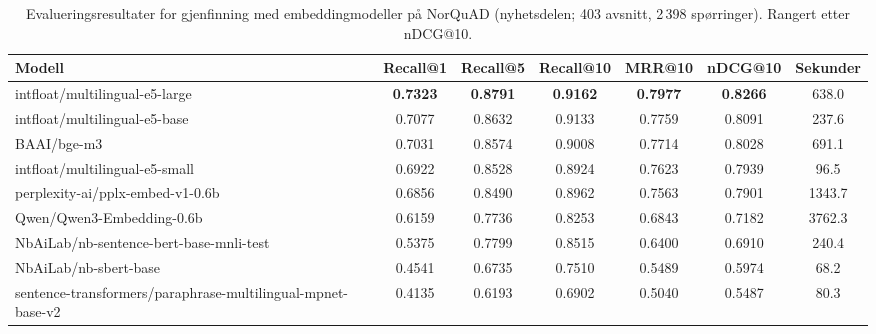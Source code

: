 \begin{table}[t]
  \centering
  \caption{Evalueringsresultater for gjenfinning med embeddingmodeller på NorQuAD (nyhetsdelen; 403 avsnitt, 2\,398 spørringer). Rangert etter nDCG@10.}
  \label{tab:norquad-retrieval}
  \begin{tabular}{@{}l S[table-format=1.4] S[table-format=1.4] S[table-format=1.4] S[table-format=1.4] S[table-format=1.4] S[table-format=4.1]@{}}
    \toprule
    \textbf{Modell} & \textbf{Recall@1} & \textbf{Recall@5} & \textbf{Recall@10} & \textbf{MRR@10} & \textbf{nDCG@10} & \textbf{Sekunder} \\
    \midrule
    intfloat/multilingual-e5-large            & \bfseries 0.7323 & \bfseries 0.8791 & \bfseries 0.9162 & \bfseries 0.7977 & \bfseries 0.8266 & 638.0 \\
    intfloat/multilingual-e5-base             & 0.7077          & 0.8632          & 0.9133          & 0.7759          & 0.8091          & 237.6 \\
    BAAI/bge-m3                               & 0.7031          & 0.8574          & 0.9008          & 0.7714          & 0.8028          & 691.1 \\
    intfloat/multilingual-e5-small            & 0.6922          & 0.8528          & 0.8924          & 0.7623          & 0.7939          & 96.5  \\
    perplexity-ai/pplx-embed-v1-0.6b          & 0.6856          & 0.8490          & 0.8962          & 0.7563          & 0.7901          & 1343.7 \\
    Qwen/Qwen3-Embedding-0.6b                 & 0.6159          & 0.7736          & 0.8253          & 0.6843          & 0.7182          & 3762.3 \\
    NbAiLab/nb-sentence-bert-base-mnli-test   & 0.5375          & 0.7799          & 0.8515          & 0.6400          & 0.6910          & 240.4 \\
    NbAiLab/nb-sbert-base                     & 0.4541          & 0.6735          & 0.7510          & 0.5489          & 0.5974          & 68.2  \\
    sentence-transformers/paraphrase-multilingual-mpnet-base-v2 & 0.4135 & 0.6193 & 0.6902 & 0.5040 & 0.5487 & 80.3 \\
    \bottomrule
  \end{tabular}
\end{table}
